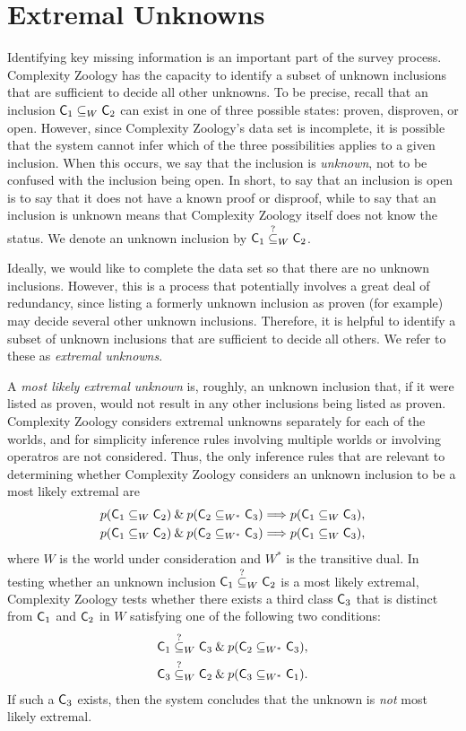 \section{Extremal Unknowns}\label{extremal-unknowns}

Identifying key missing information is an important part of the survey process.
Complexity Zoology has the capacity to identify a subset of unknown inclusions
that are sufficient to decide all other unknowns. To be precise, recall that
an inclusion $\mathsf{C}_1\subseteq_W\mathsf{C}_2$ can exist in one of three possible states:
proven, disproven, or open. However, since Complexity Zoology's data set is
incomplete, it is possible that the system cannot infer which of the three
possibilities applies to a given inclusion. When this occurs, we say that the
inclusion is \textit{unknown}, not to be confused with the inclusion being
open. In short, to say that an inclusion is open is to say that it does not
have a known proof or disproof, while to say that an inclusion is unknown
means that Complexity Zoology itself does not know the status. We denote an
unknown inclusion by $\mathsf{C}_1\stackrel{?}{\subseteq}_W\mathsf{C}_2$.

Ideally, we would like to complete the data set so that there are no unknown
inclusions. However, this is a process that potentially involves a great deal
of redundancy, since listing a formerly unknown inclusion as proven (for
example) may decide several other unknown inclusions. Therefore, it is helpful
to identify a subset of unknown inclusions that are sufficient to decide all
others. We refer to these as \textit{extremal unknowns}.

A \textit{most likely extremal unknown} is, roughly, an unknown inclusion that,
if it were listed as proven, would not result in any other inclusions being
listed as proven. Complexity Zoology considers extremal unknowns separately for
each of the worlds, and for simplicity inference rules involving multiple
worlds or involving operatros are not considered. Thus, the only inference
rules that are relevant to determining whether Complexity Zoology considers an
unknown inclusion to be a most likely extremal are
\begin{align*}
p(\mathsf{C}_1\subseteq_W\mathsf{C}_2)\mathbin{\&} p(\mathsf{C}_2\subseteq_{W^*}\mathsf{C}_3)&\Longrightarrow
p(\mathsf{C}_1\subseteq_W\mathsf{C}_3), \\
p(\mathsf{C}_1\subseteq_W\mathsf{C}_2)\mathbin{\&} p(\mathsf{C}_2\subseteq_{W^*}\mathsf{C}_3)&\Longrightarrow
p(\mathsf{C}_1\subseteq_W\mathsf{C}_3),
\end{align*}
where $W$ is the world under consideration and $W^*$ is the transitive dual. In
testing whether an unknown inclusion $\mathsf{C}_1\stackrel{?}{\subseteq}_W\mathsf{C}_2$ is a most likely
extremal, Complexity Zoology tests whether there exists a third class $\mathsf{C}_3$
that is distinct from $\mathsf{C}_1$ and $\mathsf{C}_2$ in $W$ satisfying one of the
following two conditions:
\begin{align*}
\mathsf{C}_1\stackrel{?}{\subseteq}_W\mathsf{C}_3\mathbin{\&} p(\mathsf{C}_2\subseteq_{W^*}\mathsf{C}_3), \\
\mathsf{C}_3\stackrel{?}{\subseteq}_W\mathsf{C}_2\mathbin{\&} p(\mathsf{C}_3\subseteq_{W^*}\mathsf{C}_1).
\end{align*}
If such a $\mathsf{C}_3$ exists, then the system concludes that the unknown is
\textit{not} most likely extremal.

